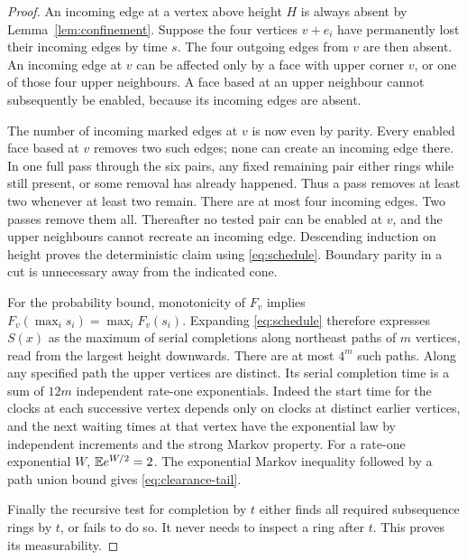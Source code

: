 \begin{proof}
An incoming edge at a vertex above height \(H\) is always absent by
Lemma~\ref{lem:confinement}. Suppose the four vertices \(v+e_i\)
have permanently lost their incoming edges by time \(s\). The four
outgoing edges from \(v\) are then absent. An incoming edge at \(v\)
can be affected only by a face with upper corner \(v\), or one of
those four upper neighbours. A face based at an upper neighbour
cannot subsequently be enabled, because its incoming edges are
absent.

The number of incoming marked edges at \(v\) is now even by parity.
Every enabled face based at \(v\) removes two such edges; none can
create an incoming edge there. In one full pass through the six
pairs, any fixed remaining pair either rings while still present,
or some removal has already happened. Thus a pass removes at least
two whenever at least two remain. There are at most four incoming
edges. Two passes remove them all. Thereafter no tested pair can
be enabled at \(v\), and the upper neighbours cannot recreate an
incoming edge. Descending induction on height proves the deterministic
claim using \eqref{eq:schedule}. Boundary parity in a cut is unnecessary
away from the indicated cone.

For the probability bound, monotonicity of \(F_v\) implies
\(F_v(\max_i s_i)=\max_iF_v(s_i)\). Expanding
\eqref{eq:schedule} therefore expresses \(S(x)\) as the maximum of
serial completions along northeast paths of \(m\) vertices, read from
the largest height downwards. There are at most \(4^m\) such paths.
Along any specified path the upper vertices are distinct. Its serial
completion time is a sum of \(12m\) independent rate-one exponentials.
Indeed the start time for the clocks at each successive vertex depends
only on clocks at distinct earlier vertices, and the next waiting
times at that vertex have the exponential law by independent increments
and the strong Markov property. For a rate-one exponential \(W\),
\(\mathbb E e^{W/2}=2\). The exponential Markov inequality followed by a path
union bound gives \eqref{eq:clearance-tail}.

Finally the recursive test for completion by \(t\) either finds all
required subsequence rings by \(t\), or fails to do so. It never needs
to inspect a ring after \(t\). This proves its measurability.
\end{proof}

